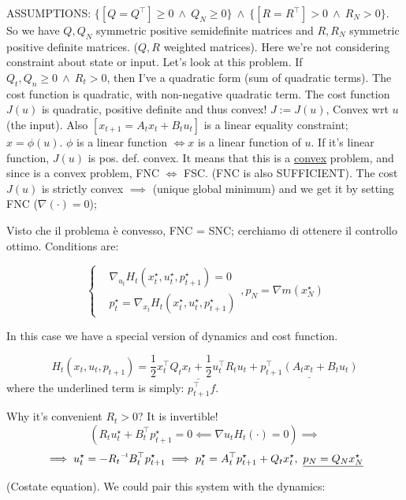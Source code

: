 ASSUMPTIONS: $\{[Q=Q^\top]\geq 0\ \land\ Q_N\geq 0\}\ \land\ \{[R=R^\top]>0\ \land\ R_N>0\}$. So we have $Q,Q_N$ symmetric positive semidefinite matrices and $R,R_N$ symmetric positive definite matrices. ($Q,R$ weighted matrices). Here we're not considering constraint about state or input. Let's look at this problem. If $Q_t,Q_n\geq 0\ \land\ R_t>0$, then I've a quadratic form (sum of quadratic terms). The cost function is quadratic, with non-negative quadratic term. The cost function $J(u)$ is quadratic, positive definite and thus convex! $J := J(u)$, Convex wrt $u$ (the input). Also $[x_{t+1}=A_tx_t + B_tu_t]$ is a linear equality constraint; $x=\phi(u)$. $\phi$ is a linear function $\iff x$ is a linear function of $u$.  If it's linear function, $J(u)$ is pos. def. convex. It means that this is a \underline{convex} problem, and since is a convex problem, FNC $\iff$ FSC. (FNC is also SUFFICIENT). The cost $J(u)$ is strictly convex $\implies$ (unique global minimum) and we get it by setting FNC ($\nabla{(\mathord{\cdot})} = 0$);

Visto che il problema è convesso, FNC = SNC; cerchiamo di ottenere il controllo ottimo. Conditions are:

\[
	\left\{
	\begin{aligned}
	&\nabla_{u_t}{H_t(x_t^\star,u_t^\star,p_{t+1}^\star)} = 0\\
	&p_t^\star = \nabla_{x_t}{H_t(x_t^\star,u_t^\star,p_{t+1}^\star)}
	\end{aligned}
	\right. , p_N=\nabla{m(x_N^\star)}
\]

In this case we have a special version of dynamics and cost function.

\[
	H_t(x_t,u_t,p_{t+1}) = \underline{\frac{1}{2}x_t^\top Q_tx_t + \frac{1}{2}u_t^\top R_tu_t} + \underline{p_{t+1}^\top(A_tx_t + B_tu_t)}
\]
where the underlined term is simply: $p_{t+1}^\top f$.

Why it's convenient $R_t>0$? It is invertible!
\[
	(R_tu_t^\star + B_t^\top p_{t+1}^\star = 0 \impliedby \nabla{u_t}{H_t(\mathord{\cdot})} = 0) \implies
\]
\[
	\implies u_t^\star = -\inv{R_t}B_t^\top p_{t+1}^\star \implies p_t^\star = A_t^\top p_{t+1}^\star + Q_tx_t^\star,\ \underline{p_N = Q_Nx_N^\star}
\]

(Costate equation). We could pair this system with the dynamics:

